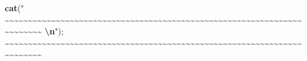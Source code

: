 \documentclass[
]{article}
\newenvironment{Shaded}{\begin{snugshade}}{\end{snugshade}}
\newcommand{\ErrorTok}[1]{\textcolor[rgb]{0.64,0.00,0.00}{\textbf{#1}}}
\newcommand{\FunctionTok}[1]{\textcolor[rgb]{0.13,0.29,0.53}{\textbf{#1}}}
\newcommand{\NormalTok}[1]{#1}
\newcommand{\SpecialCharTok}[1]{\textcolor[rgb]{0.81,0.36,0.00}{\textbf{#1}}}
\newcommand{\StringTok}[1]{\textcolor[rgb]{0.31,0.60,0.02}{#1}}
\begin{document}
\begin{Shaded}
\begin{Highlighting}[]
  
\FunctionTok{cat}\NormalTok{(}\StringTok{"    \textasciitilde{}\textasciitilde{}\textasciitilde{}\textasciitilde{}\textasciitilde{}\textasciitilde{}\textasciitilde{}\textasciitilde{}\textasciitilde{}\textasciitilde{}\textasciitilde{}\textasciitilde{}\textasciitilde{}\textasciitilde{}\textasciitilde{}\textasciitilde{}\textasciitilde{}\textasciitilde{}\textasciitilde{}\textasciitilde{}\textasciitilde{}\textasciitilde{}\textasciitilde{}\textasciitilde{}\textasciitilde{}\textasciitilde{}\textasciitilde{}\textasciitilde{}\textasciitilde{}\textasciitilde{}\textasciitilde{}\textasciitilde{}\textasciitilde{}\textasciitilde{}\textasciitilde{}\textasciitilde{}\textasciitilde{}\textasciitilde{}\textasciitilde{}\textasciitilde{}\textasciitilde{}\textasciitilde{}\textasciitilde{}\textasciitilde{}\textasciitilde{}\textasciitilde{}\textasciitilde{}\textasciitilde{}\textasciitilde{}\textasciitilde{}\textasciitilde{}\textasciitilde{}\textasciitilde{}\textasciitilde{}\textasciitilde{}\textasciitilde{}\textasciitilde{}\textasciitilde{}\textasciitilde{}\textasciitilde{}\textasciitilde{}\textasciitilde{}\textasciitilde{}\textasciitilde{}\textasciitilde{}\textasciitilde{}\textasciitilde{}\textasciitilde{}\textasciitilde{}\textasciitilde{}\textasciitilde{}\textasciitilde{}    }\SpecialCharTok{\textbackslash{}n}\StringTok{"}\NormalTok{); }
    \SpecialCharTok{\textasciitilde{}}\ErrorTok{\textasciitilde{}\textasciitilde{}\textasciitilde{}\textasciitilde{}\textasciitilde{}\textasciitilde{}\textasciitilde{}\textasciitilde{}\textasciitilde{}\textasciitilde{}\textasciitilde{}\textasciitilde{}\textasciitilde{}\textasciitilde{}\textasciitilde{}\textasciitilde{}\textasciitilde{}\textasciitilde{}\textasciitilde{}\textasciitilde{}\textasciitilde{}\textasciitilde{}\textasciitilde{}\textasciitilde{}\textasciitilde{}\textasciitilde{}\textasciitilde{}\textasciitilde{}\textasciitilde{}\textasciitilde{}\textasciitilde{}\textasciitilde{}\textasciitilde{}\textasciitilde{}\textasciitilde{}\textasciitilde{}\textasciitilde{}\textasciitilde{}\textasciitilde{}\textasciitilde{}\textasciitilde{}\textasciitilde{}\textasciitilde{}\textasciitilde{}\textasciitilde{}\textasciitilde{}\textasciitilde{}\textasciitilde{}\textasciitilde{}\textasciitilde{}\textasciitilde{}\textasciitilde{}\textasciitilde{}\textasciitilde{}\textasciitilde{}\textasciitilde{}\textasciitilde{}\textasciitilde{}\textasciitilde{}\textasciitilde{}\textasciitilde{}\textasciitilde{}\textasciitilde{}\textasciitilde{}\textasciitilde{}\textasciitilde{}\textasciitilde{}\textasciitilde{}\textasciitilde{}\textasciitilde{}\textasciitilde{}}    
\end{Highlighting}
\end{Shaded}
\end{document}
